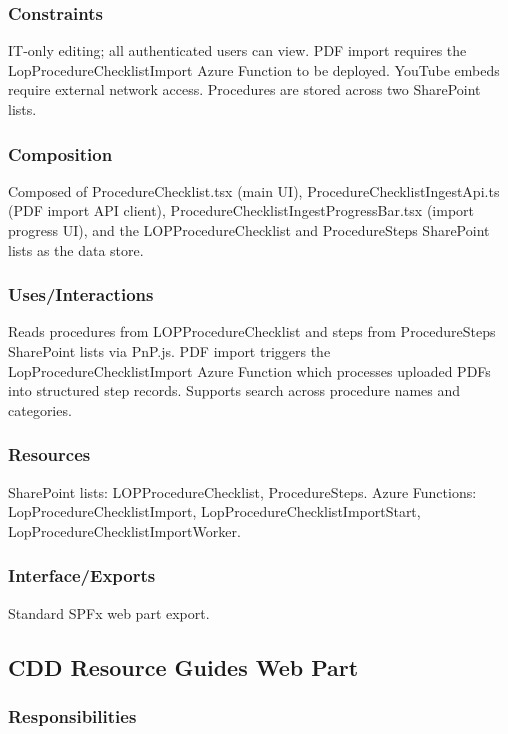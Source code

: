 \documentclass[12pt]{article}
\begin{document}
\subsubsection{Constraints}

IT-only editing; all authenticated users can view. PDF import requires the LopProcedureChecklistImport Azure Function to be deployed. YouTube embeds require external network access. Procedures are stored across two SharePoint lists.

\subsubsection{Composition}

Composed of ProcedureChecklist.tsx (main UI), ProcedureChecklistIngestApi.ts (PDF import API client), ProcedureChecklistIngestProgressBar.tsx (import progress UI), and the LOPProcedureChecklist and ProcedureSteps SharePoint lists as the data store.

\subsubsection{Uses/Interactions}

Reads procedures from LOPProcedureChecklist and steps from ProcedureSteps SharePoint lists via PnP.js. PDF import triggers the LopProcedureChecklistImport Azure Function which processes uploaded PDFs into structured step records. Supports search across procedure names and categories.

\subsubsection{Resources}

SharePoint lists: LOPProcedureChecklist, ProcedureSteps. Azure Functions: LopProcedureChecklistImport, LopProcedureChecklistImportStart, LopProcedureChecklistImportWorker.

\subsubsection{Interface/Exports}

Standard SPFx web part export.

\subsection{CDD Resource Guides Web Part}

\subsubsection{Responsibilities}
\end{document}
